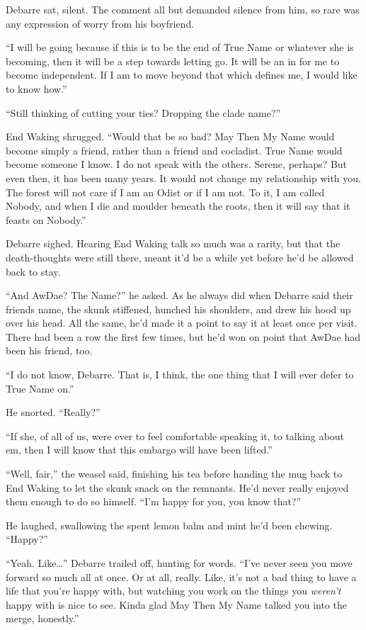 Debarre sat, silent. The comment all but demanded silence from him, so rare was any expression of worry from his boyfriend.

``I will be going because if this is to be the end of True Name or whatever she is becoming, then it will be a step towards letting go. It will be an in for me to become independent. If I am to move beyond that which defines me, I would like to know how.''

``Still thinking of cutting your ties? Dropping the clade name?''

End Waking shrugged. ``Would that be so bad? May Then My Name would become simply a friend, rather than a friend and cocladist. True Name would become someone I know. I do not speak with the others. Serene, perhaps? But even then, it has been many years. It would not change my relationship with you. The forest will not care if I am an Odist or if I am not. To it, I am called Nobody, and when I die and moulder beneath the roots, then it will say that it feasts on Nobody.''

Debarre sighed. Hearing End Waking talk so much was a rarity, but that the death-thoughts were still there, meant it'd be a while yet before he'd be allowed back to stay.

``And AwDae? The Name?'' he asked. As he always did when Debarre said their friends name, the skunk stiffened, hunched his shoulders, and drew his hood up over his head. All the same, he'd made it a point to say it at least once per visit. There had been a row the first few times, but he'd won on point that AwDae had been his friend, too.

``I do not know, Debarre. That is, I think, the one thing that I will ever defer to True Name on.''

He snorted. ``Really?''

``If she, of all of us, were ever to feel comfortable speaking it, to talking about em, then I will know that this embargo will have been lifted.''

``Well, fair,'' the weasel said, finishing his tea before handing the mug back to End Waking to let the skunk snack on the remnants. He'd never really enjoyed them enough to do so himself. ``I'm happy for you, you know that?''

He laughed, swallowing the spent lemon balm and mint he'd been chewing. ``Happy?''

``Yeah. Like\ldots{}'' Debarre trailed off, hunting for words. ``I've never seen you move forward so much all at once. Or at all, really. Like, it's not a bad thing to have a life that you're happy with, but watching you work on the things you \emph{weren't} happy with is nice to see. Kinda glad May Then My Name talked you into the merge, honestly.''

